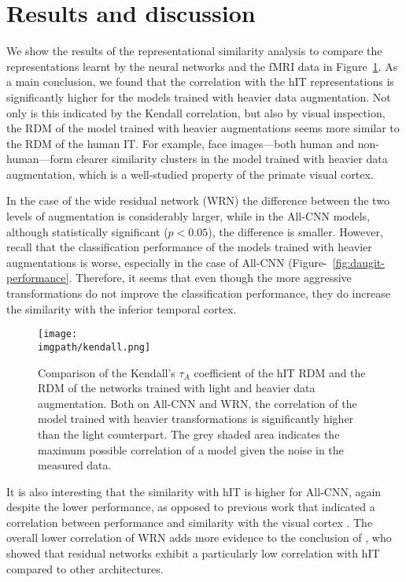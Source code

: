 {\section{Results and discussion}
\label{sec:daugit-results}
We show the results of the representational similarity analysis to compare the representations learnt by the neural networks and the fMRI data in Figure~\ref{fig:kendall}. As a main conclusion, we found that the correlation with the hIT representations is significantly higher for the models trained with heavier data augmentation. Not only is this indicated by the Kendall correlation, but also by visual inspection, the RDM of the model trained with heavier augmentations seems more similar to the RDM of the human IT. For example, face images---both human and non-human---form clearer similarity clusters in the model trained with heavier data augmentation, which is a well-studied property of the primate visual cortex. 

In the case of the wide residual network (WRN) the difference between the two levels of augmentation is considerably larger, while in the All-CNN models, although statistically significant ($p<0.05$), the difference is smaller. However, recall that the classification performance of the models trained with heavier augmentations is worse, especially in the case of All-CNN (Figure-~\ref{fig:daugit-performance}. Therefore, it seems that even though the more aggressive transformations do not improve the classification performance, they do increase the similarity with the inferior temporal cortex. 

\begin{figure}[ht]
  \begin{center}
    \texttt{[image: \\imgpath/kendall.png]}
  \end{center}
  \caption{Comparison of the Kendall's $\tau_{A}$ coefficient of the hIT RDM and the RDM of the networks trained with light and heavier data augmentation. Both on All-CNN and WRN, the correlation of the model trained with heavier transformations is significantly higher than the light counterpart. The grey shaded area indicates the maximum possible correlation of a model given the noise in the measured data.}
  \label{fig:kendall}
\end{figure}

It is also interesting that the similarity with hIT is higher for All-CNN, again despite the lower performance, as opposed to previous work that indicated a correlation between performance and similarity with the visual cortex \citep{yamins2014annsbrains}. The overall lower correlation of WRN adds more evidence to the conclusion of \citet{storrs2017ccn}, who showed that residual networks exhibit a particularly low correlation with hIT compared to other architectures.

}
